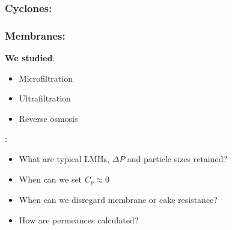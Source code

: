 {
\begin{frame}\frametitle{Cyclones: {}}
\end{frame}}

{
\begin{frame}\frametitle{Membranes: {}}
	\textbf{We studied}:
	\begin{itemize}
		\item	Microfiltration
		\item	Ultrafiltration
		\item	Reverse osmosis
	\end{itemize}
	
	\vspace{3cm}
	\emph{{\color{myGreen}{Some things to consider}}}:
	\begin{itemize}
		\item	What are typical LMHs, $\Delta P$ and particle sizes retained?
		\item	When can we set $C_p \approx 0$
		\item	When can we disregard membrane or cake resistance?
		\item	How are permeances calculated?
	\end{itemize}
\end{frame}}

